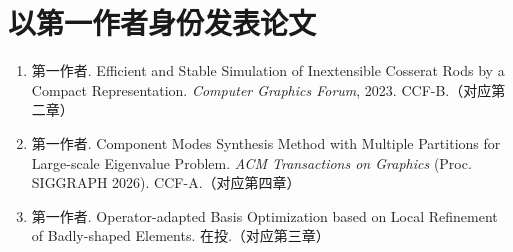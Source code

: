 \cleardoublepage
{}

\section*{以第一作者身份发表论文}
\begin{enumerate}
    \item 第一作者. Efficient and Stable Simulation of Inextensible Cosserat Rods by a Compact Representation. \textit{Computer Graphics Forum}, 2023. CCF-B.（对应第二章）
    \item 第一作者. Component Modes Synthesis Method with Multiple Partitions for Large-scale Eigenvalue Problem. \textit{ACM Transactions on Graphics} (Proc. SIGGRAPH 2026). CCF-A.（对应第四章）
    \item 第一作者. Operator-adapted Basis Optimization based on Local Refinement of Badly-shaped Elements. 在投.（对应第三章）
\end{enumerate}
